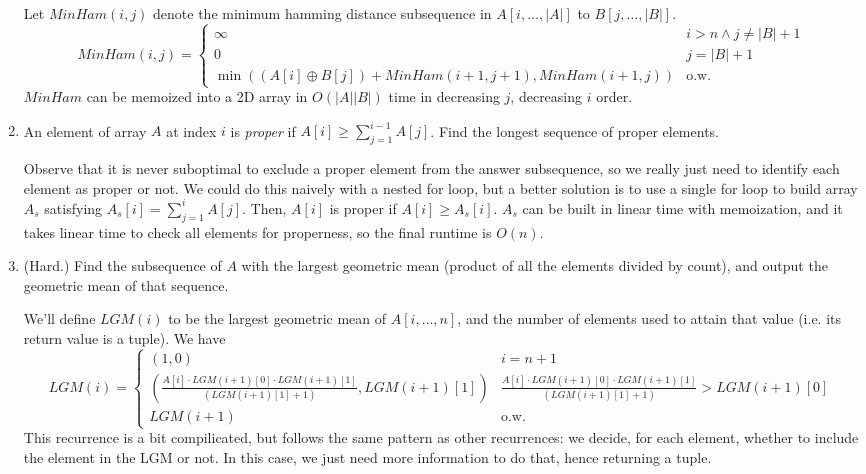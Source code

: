 \documentclass[fleqn]{article}
\begin{document}
\begin{enumerate}
\begin{answer}
        Let $MinHam(i,j)$ denote the minimum hamming distance subsequence in $A[i,\dots,|A|]$ to $B[j,\dots,|B|]$.
        \[
            MinHam(i,j) = \begin{cases}
                \infty & i > n \wedge j \neq |B| + 1 \\
                0 & j = |B| + 1 \\
                \min((A[i] \oplus B[j]) + MinHam(i+1,j+1), MinHam(i+1,j)) & \text{o.w.}
            \end{cases}
        \]
        $MinHam$ can be memoized into a 2D array in $O(|A||B|)$ time in decreasing $j$, decreasing $i$ order.
    \end{answer}
    \item An element of array $A$ at index $i$ is \textit{proper} if $A[i] \geq \sum_{j=1}^{i-1} A[j]$. Find the longest sequence of proper elements.
    \begin{answer}
        Observe that it is never suboptimal to exclude a proper element from the answer subsequence, so we really just need to identify each element as proper or not. We could do this naively with a nested for loop, but a better solution is to use a single for loop to build array $A_s$ satisfying $A_s[i] = \sum_{j=1}^i A[j]$. Then, $A[i]$ is proper if $A[i] \geq A_s[i]$.  $A_s$ can be built in linear time with memoization, and it takes linear time to check all elements for properness, so the final runtime is $O(n)$.
    \end{answer}
    \item (Hard.) Find the subsequence of $A$ with the largest geometric mean (product of all the elements divided by count), and output the geometric mean of that sequence. 
    \begin{answer}
      We'll define $LGM(i)$ to be the largest geometric mean of $A[i, \dots, n]$, and the number of elements used to attain that value (i.e. its return value is a tuple). We have
        \[
            LGM(i) = \begin{cases}
                (1,0) & i = n + 1 \\
                \left(\frac{A[i] \cdot LGM(i+1)[0] \cdot LGM(i+1)[1]}{(LGM(i+1)[1] + 1)}, LGM(i+1)[1]\right) & \frac{A[i] \cdot LGM(i+1)[0] \cdot LGM(i+1)[1]}{(LGM(i+1)[1] + 1)} > LGM(i+1)[0] \\
                LGM(i+1) & \text{o.w.}
            \end{cases}
        \]
        This recurrence is a bit compilicated, but follows the same pattern as other recurrences: we decide, for each element, whether to include the element in the LGM or not. In this case, we just need more information to do that, hence returning a tuple.

\end{answer}
\end{enumerate}
\end{document}
